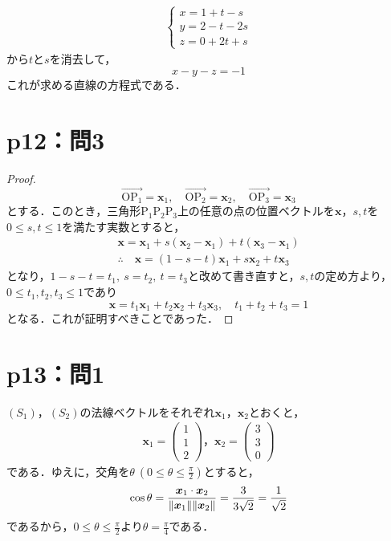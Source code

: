 \documentclass[a4paper,10pt,fleqn]{ltjsarticle}
\begin{document}
\begin{tleftbar}
  \begin{align*}
    \begin{cases}
      x=1+t-s   \\
      y=2-t -2s \\
      z=0+2t+s
    \end{cases}
  \end{align*}
  から$t$と$s$を消去して，
  \[
    x-y-z=-1
  \]
  これが求める直線の方程式である．
\end{tleftbar}

\section*{p12：問3}

\begin{tleftbar}
  \begin{proof}
    \[
      \overrightarrow{\mathrm{OP_1}}=\bm{x}_1,\quad \overrightarrow{\mathrm{OP_2}}=\bm{x}_2,\quad \overrightarrow{\mathrm{OP_3}}=\bm{x}_3
    \]
    とする．このとき，三角形$\mathrm{P_1 P_2 P_3}$上の任意の点の位置ベクトルを$\bm{x}$，$s,t$を$0 \le s,t \le 1$を満たす実数とすると，
    \begin{gather*}
      \bm{x}=\bm{x}_1 + s(\bm{x}_2 - \bm{x}_1) + t (\bm{x}_3 - \bm{x}_1) \\
      \therefore \quad \bm{x} = (1-s-t)\bm{x}_1 + s\bm{x}_2 + t \bm{x}_3
    \end{gather*}
    となり，$1-s-t=t_1,~s=t_2,~t=t_3$と改めて書き直すと，$s,t$の定め方より，$0 \le t_1 ,t_2,t_3 \le 1$であり
    \[
      \bm{x} = t_1\bm{x}_1 + t_2\bm{x}_2 + t_3 \bm{x}_3,\quad t_1+t_2+t_3=1
    \]
    となる．これが証明すべきことであった．
  \end{proof}
\end{tleftbar}
%
\newpage
%
\section*{p13：問1}
%
\begin{tleftbar}
  $(S_1)$，$(S_2)$の法線ベクトルをそれぞれ$\bm{x}_1$，$\bm{x}_2$とおくと，
  \begin{gather*}
    \bm{x}_1 =
    \begin{pmatrix}
      1 \\
      1 \\
      2
    \end{pmatrix}
    ，
    \bm{x}_2 =
    \begin{pmatrix}
      3 \\
      3 \\
      0
    \end{pmatrix}
  \end{gather*}
  である．ゆえに，交角を$\theta ~(0 \le \theta \le \frac{\pi}{2})$とすると，
  \[
    \cos \theta = \frac{\bm{x}_1 \cdot \bm{x}_2}{\norm{\bm{x}_1} \norm{\bm{x}_2}}=\frac{3}{3\sqrt{2}}=\frac{1}{\sqrt{2}}
  \]
  であるから，$0 \le \theta \le \frac{\pi}{2}$より$\theta =\frac{\pi}{4}$である．
\end{tleftbar}
%
\end{document}

